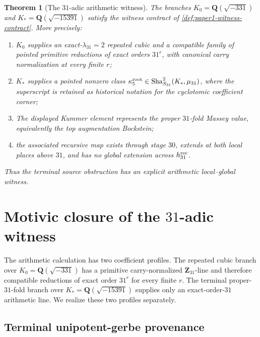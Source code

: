 \documentclass[11pt]{article}
\newtheorem{theorem}{Theorem}[section]
\theoremstyle{remark}
\providecommand{\Sha}{\operatorname{Sha}}
\begin{document}
\begin{theorem}[The \(31\)-adic arithmetic witness]\label{thm:paper1-31adic-witness}
The branches \(K_0=\mathbf Q(\sqrt{-331})\) and \(K_*=\mathbf Q(\sqrt{-15391})\) satisfy the witness contract of \cref{def:paper1-witness-contract}.  More precisely:
\begin{enumerate}[label=\textup{(\roman*)}]
\item \(K_0\) supplies an exact-\(\lambda_{31}=2\) repeated cubic and a compatible family of pointed primitive reductions of exact orders \(31^r\), with canonical carry normalization at every finite \(r\);
\item \(K_*\) supplies a pointed nonzero class \(\kappa_5^{\rm root}\in\Sha^2_{S_{31}}(K_*,\mu_{31})\), where the superscript is retained as historical notation for the cyclotomic coefficient corner;
\item The displayed Kummer element represents the proper \(31\)-fold Massey value, equivalently the top augmentation Bockstein;
\item the associated recursive map exists through stage \(30\), extends at both local places above \(31\), and has no global extension across \(h_{31}^{\rm rec}\).
\end{enumerate}
Thus the terminal source obstruction has an explicit arithmetic local--global witness.
\end{theorem}

\section{Motivic closure of the \(31\)-adic witness}
\label{W31-sec:motivic-closure}

The arithmetic calculation has two coefficient profiles.  The repeated cubic
branch over \(K_0=\mathbf Q(\sqrt{-331})\) has a primitive carry-normalized
\(\mathbf Z_{31}\)-line and therefore compatible reductions of exact order
\(31^r\) for every finite \(r\).  The terminal proper-\(31\)-fold branch over
\(K_*=\mathbf Q(\sqrt{-15391})\) supplies only an exact-order-\(31\) arithmetic
line.  We realize these two profiles separately.

\subsection{Terminal unipotent-gerbe provenance}
\end{document}
